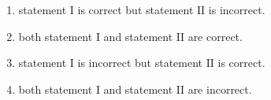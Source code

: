     \hfill{}
    
    \begin{enumerate}
        \item statement $\mathrm{I}$ is correct but statement $\mathrm{II}$ is incorrect. 
        \item both statement $\mathrm{I}$ and statement $\mathrm{II}$ are correct.
        \item statement $\mathrm{I}$ is incorrect but statement $\mathrm{II}$ is correct. 
        \item both statement $\mathrm{I}$ and statement $\mathrm{II}$ are incorrect.  
    \end{enumerate}
%

